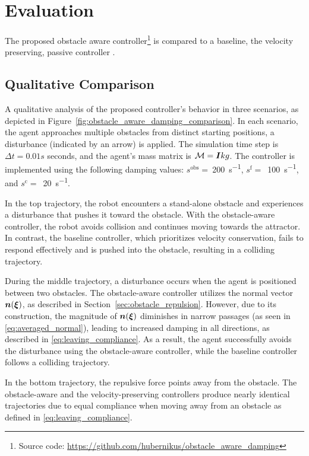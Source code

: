 \section{Evaluation}  \label{sec:evaluation} 
The proposed obstacle aware controller\footnote{Source code: \url{https://github.com/hubernikus/obstacle_aware_damping}} is compared to a baseline, the velocity preserving, passive controller \cite{kronander2015passive}.

\subsection{Qualitative Comparison} \label{sec:qual_comp}
A qualitative analysis of the proposed controller's behavior in three scenarios, as depicted in Figure~\ref{fig:obstacle_aware_damping_comparison}. In each scenario, the agent approaches multiple obstacles from distinct starting positions, a disturbance (indicated by an arrow) is applied. The simulation time step is $\Delta t = 0.01 s$ seconds, and the agent's mass matrix is $\mathcal{M} = \boldsymbol{I} kg$. The controller is implemented using the following damping values:
$s^{\mathrm{obs}}=~$\qty{200}{s^{-1}},
$s^{\mathrm{f}}=$~\qty{100}{s^{-1}}, and
$s^{\mathrm{c}}=$~\qty{20}{s^{-1}}.

In the top trajectory, the robot encounters a stand-alone obstacle and experiences a disturbance that pushes it toward the obstacle. With the obstacle-aware controller, the robot avoids collision and continues moving towards the attractor. In contrast, the baseline controller, which prioritizes velocity conservation, fails to respond effectively and is pushed into the obstacle, resulting in a colliding trajectory.

During the middle trajectory, a disturbance occurs when the agent is positioned between two obstacles. The obstacle-aware controller utilizes the normal vector $\boldsymbol{n}(\boldsymbol{\xi})$, as described in Section~\ref{sec:obstacle_repulsion}. However, due to its construction, the magnitude of $\boldsymbol{n}(\boldsymbol{\xi})$ diminishes in narrow passages (as seen in \eqref{eq:averaged_normal}), leading to increased damping in all directions, as described in \eqref{eq:leaving_compliance}. As a result, the agent successfully avoids the disturbance using the obstacle-aware controller, while the baseline controller follows a colliding trajectory.

In the bottom trajectory, the repulsive force points away from the obstacle. The obstacle-aware and the velocity-preserving controllers produce nearly identical trajectories due to equal compliance when moving away from an obstacle as defined in \eqref{eq:leaving_compliance}.


